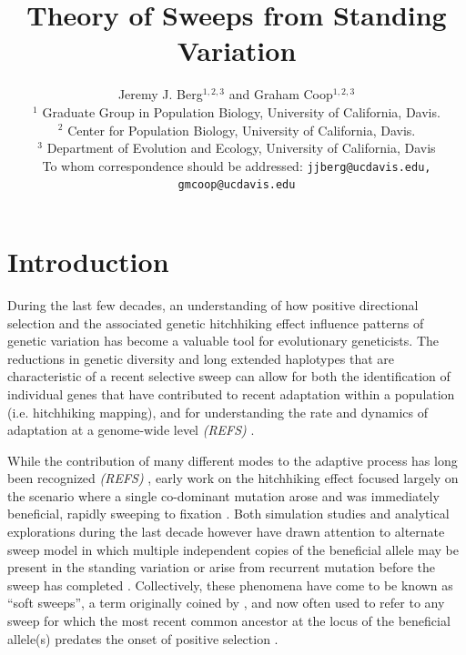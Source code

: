 \documentclass[a4paper,10pt]{article}
\title{Theory of Sweeps from Standing Variation}
\author{
Jeremy J. Berg$^{1,2,3}$ and Graham Coop$^{1,2,3}$ \\
$^1$ Graduate Group in Population Biology, University of California, Davis. \\
$^2$ Center for Population Biology, University of California, Davis.\\
$^3$ Department of Evolution and Ecology, University of California, Davis\\
\small To whom correspondence should be addressed: \texttt{jjberg@ucdavis.edu, gmcoop@ucdavis.edu}\\
}
\date{}
\newcommand{\jb}[1]{{\it\color{blue} (#1)} }
\begin{document}
\maketitle

\begin{abstract}
\end{abstract}

\section{Introduction}

During the last few decades, an understanding of how positive directional selection and the associated genetic hitchhiking effect influence patterns of genetic variation has become a valuable tool for evolutionary geneticists. The reductions in genetic diversity and long extended haplotypes that are characteristic of a recent selective sweep can allow for both the identification of individual genes that have contributed to recent adaptation within a population (i.e. hitchhiking mapping), and for understanding the rate and dynamics of adaptation at a genome-wide level \jb{REFS}.

While the contribution of many different modes to the adaptive process has long been recognized \jb{REFS}, early work on the hitchhiking effect focused largely on the scenario where a single co-dominant mutation arose and was immediately beneficial, rapidly sweeping to fixation \citep{Smith1974,Kaplan1989}. Both simulation studies and analytical explorations during the last decade however have drawn attention to alternate sweep model in which multiple independent copies of the beneficial allele may be present in the standing variation or arise from recurrent mutation before the sweep has completed \citep{Innan:2004bk,Przeworski2005,Hermisson2005,Pennings2006a,Pennings2006,Hermisson2008,BARRETT:2008cs,Ralph2010,Pokalyuk2012,Roesti:2014gp,Wilson:2014ke}. Collectively, these phenomena have come to be known as ``soft sweeps'', a term originally coined by \cite{Hermisson2005}, and now often used to refer to any sweep for which the most recent common ancestor at the locus of the beneficial allele(s) predates the onset of positive selection \citep{Messer:2013kh}.
\end{document}
